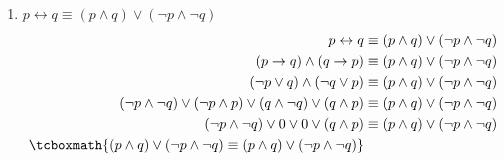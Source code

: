 \documentclass[10pt,letterpaper]{article}
\begin{document}
\begin{enumerate}
\begin{enumerate}
            \item $p \leftrightarrow q \equiv (p \land q) \lor (\neg p \land \neg q)$
                \begin{equation*} \begin{split} \begin{aligned}
                    p \leftrightarrow q
                        &\equiv
                    (p \land q) \lor (\neg p \land \neg q) \\
                    (p \rightarrow q) \land (q \rightarrow p)
                        &\equiv
                    (p \land q) \lor (\neg p \land \neg q) \\
                    (\neg p \lor q) \land (\neg q \lor p)
                        &\equiv
                    (p \land q) \lor (\neg p \land \neg q) \\
                    (\neg p \land \neg q) \lor (\neg p \land p) \lor (q \land \neg q) \lor (q \land p)
                        &\equiv
                    (p \land q) \lor (\neg p \land \neg q) \\
                    (\neg p \land \neg q) \lor 0 \lor 0 \lor (q \land p)
                        &\equiv
                    (p \land q) \lor (\neg p \land \neg q) \\
                    \tcboxmath{
                        (p \land q) \lor (\neg p \land \neg q)
                            \equiv (p \land q)
                        \lor (\neg p \land \neg q)
                    }
                \end{aligned} \end{split} \end{equation*}
        \end{enumerate}


\end{enumerate}
\end{document}

